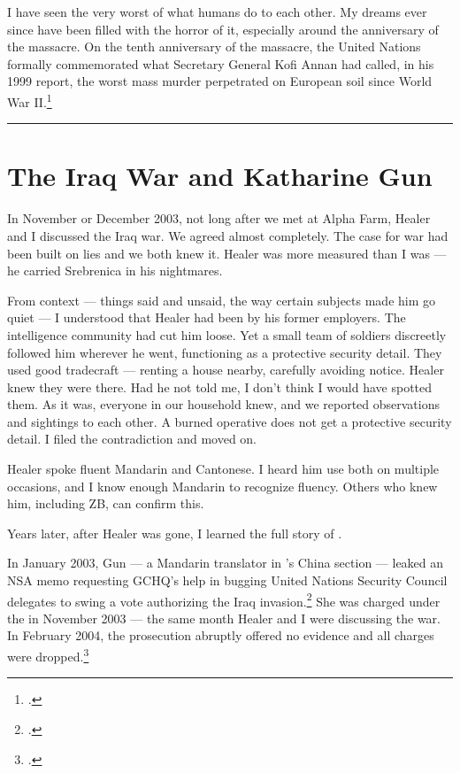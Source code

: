 I have seen the very worst of what humans do to each other. My dreams ever since have been filled with the horror of it, especially around the anniversary of the massacre. On the tenth anniversary of the massacre, the United Nations formally commemorated what Secretary General Kofi Annan had called, in his 1999 report, the worst mass murder perpetrated on European soil since World War II.\footcites{sudetic2010}{annan1999}

\vspace{1cm}\noindent\rule{0.5\textwidth}{0.5pt}\vspace{0.5cm}

\section*{The Iraq War and Katharine Gun}
\label{record:hs-iraq-katharine-gun}

In November or December 2003, not long after we met at Alpha Farm, Healer and I discussed the Iraq war. We agreed almost completely. The case for war had been built on lies and we both knew it. Healer was more measured than I was --- he carried Srebrenica in his nightmares.

From context --- things said and unsaid, the way certain subjects made him go quiet --- I understood that Healer had been  by his former employers. The intelligence community had cut him loose. Yet a small team of  soldiers discreetly followed him wherever he went, functioning as a protective security detail. They used good tradecraft --- renting a house nearby, carefully avoiding notice. Healer knew they were there. Had he not told me, I don't think I would have spotted them. As it was, everyone in our household knew, and we reported observations and sightings to each other. A burned operative does not get a protective security detail. I filed the contradiction and moved on.

Healer spoke fluent Mandarin and Cantonese. I heard him use both on multiple occasions, and I know enough Mandarin to recognize fluency. Others who knew him, including ZB, can confirm this.

Years later, after Healer was gone, I learned the full story of .

In January 2003, Gun --- a Mandarin translator in 's China section --- leaked an NSA memo requesting GCHQ's help in bugging United Nations Security Council delegates to swing a vote authorizing the Iraq invasion.\footcite{brighton2004} She was charged under the  in November 2003 --- the same month Healer and I were discussing the war. In February 2004, the prosecution abruptly offered no evidence and all charges were dropped.\footcite{bbc2004gun}

